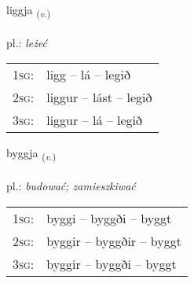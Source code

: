 \documentclass[frontgrid, backgrid]{flacards}\usepackage[]{graphicx}\usepackage[]{xcolor}
\begin{document}
{liggja \small{\textsubscript{(\textit{v.})}} \\[1ex] %
\textphonetic{[lɪca]} \\
pl.: \emph{leżeć} \\  [2ex]
\renewcommand*{\arraystretch}{0.8}
\begin{tabular}{p{1cm}l}
\textsc{1sg}: & ligg -- lá -- legið \\ 
\textsc{2sg}: & liggur -- lást -- legið \\ 
\textsc{3sg}: & liggur -- lá -- legið \\ 
\end{tabular}
}

\renewcommand{\flhead}{\vskip5pt \fboxsep=0pt {\small\bfseries\footnotesize Sagnorð | Verb}}
\renewcommand{\fcfoot}{\vskip5pt \fboxsep=0pt \hspace{2pt}{\small\bfseries\footnotesize 1K}}

\renewcommand{\blhead}{\vskip5pt {\small\bfseries\footnotesize Sagnorð | Verb }}
\renewcommand{\bcfoot}{\vskip5pt \hspace{2pt}{\small\bfseries\footnotesize 1K}}


{byggja \small{\textsubscript{(\textit{v.})}} \\[1ex] %
\textphonetic{[pɪca]} \\
pl.: \emph{budować; zamieszkiwać} \\  [2ex]
\renewcommand*{\arraystretch}{0.8}
\begin{tabular}{p{1cm}l}
\textsc{1sg}: & byggi -- byggði -- byggt \\ 
\textsc{2sg}: & byggir -- byggðir -- byggt \\ 
\textsc{3sg}: & byggir -- byggði -- byggt \\ 
\end{tabular}
}

\renewcommand{\flhead}{\vskip5pt \fboxsep=0pt {\small\bfseries\footnotesize Nafnorð | Noun}}
\renewcommand{\fcfoot}{\vskip5pt \fboxsep=0pt \hspace{2pt}{\small\bfseries\footnotesize 1K}}
\end{document}
